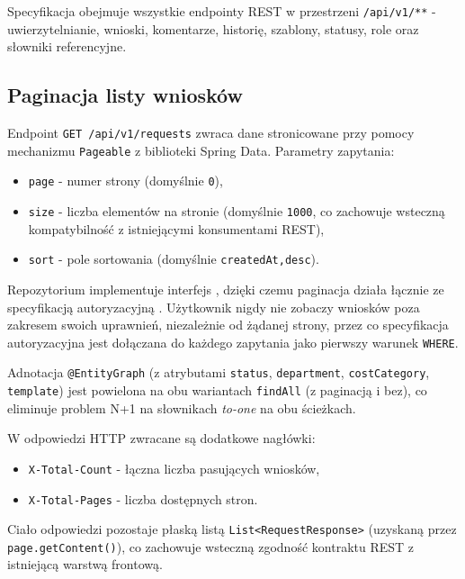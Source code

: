 \documentclass[12pt,a4paper]{article}
\begin{document}
Specyfikacja obejmuje wszystkie endpointy REST w przestrzeni
\texttt{/api/v1/**} - uwierzytelnianie, wnioski, komentarze, historię,
szablony, statusy, role oraz słowniki referencyjne.

\subsection{Paginacja listy wniosków}
Endpoint \texttt{GET /api/v1/requests} zwraca dane stronicowane przy pomocy
mechanizmu \texttt{Pageable} z biblioteki Spring Data. Parametry zapytania:

\begin{itemize}[leftmargin=*]
  \item \texttt{page} - numer strony (domyślnie \texttt{0}),
  \item \texttt{size} - liczba elementów na stronie (domyślnie \texttt{1000},
        co zachowuje wsteczną kompatybilność z istniejącymi konsumentami REST),
  \item \texttt{sort} - pole sortowania (domyślnie \texttt{createdAt,desc}).
\end{itemize}

Repozytorium \texttt{} implementuje interfejs
\texttt{}, dzięki czemu paginacja działa
łącznie ze specyfikacją autoryzacyjną \texttt{}.
Użytkownik nigdy nie zobaczy wniosków poza zakresem swoich uprawnień,
niezależnie od żądanej strony, przez co specyfikacja autoryzacyjna jest dołączana
do każdego zapytania jako pierwszy warunek \texttt{WHERE}.

Adnotacja \texttt{@EntityGraph} (z atrybutami \texttt{status}, \texttt{department},
\texttt{costCategory}, \texttt{template}) jest powielona na obu wariantach
\texttt{findAll} (z paginacją i bez), co eliminuje problem N+1 na słownikach
\emph{to-one} na obu ścieżkach.

W odpowiedzi HTTP zwracane są dodatkowe nagłówki:
\begin{itemize}[leftmargin=*]
  \item \texttt{X-Total-Count} - łączna liczba pasujących wniosków,
  \item \texttt{X-Total-Pages} - liczba dostępnych stron.
\end{itemize}
Ciało odpowiedzi pozostaje płaską listą \texttt{List<RequestResponse>}
(uzyskaną przez \texttt{page.getContent()}), co zachowuje wsteczną zgodność
kontraktu REST z istniejącą warstwą frontową.
\end{document}
